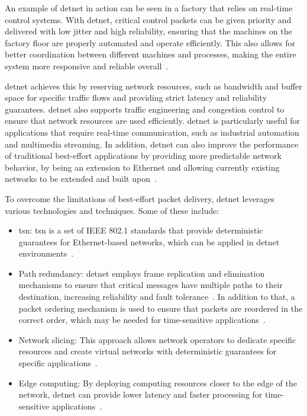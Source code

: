 \documentclass[runningheads]{llncs}
\begin{document}
An example of \gls{detnet} in action can be seen in a factory that relies on real-time control systems. With \gls{detnet}, critical control packets can be given priority and delivered with low jitter and high reliability, ensuring that the machines on the factory floor are properly automated and operate efficiently. This also allows for better coordination between different machines and processes, making the entire system more responsive and reliable overall~\cite{rfc8578}.

\gls{detnet} achieves this by reserving network resources, such as bandwidth and buffer space for specific traffic flows and providing strict latency and reliability guarantees. \gls{detnet} also supports traffic engineering and congestion control to ensure that network resources are used efficiently. \gls{detnet} is particularly useful for applications that require real-time communication, such as industrial automation and multimedia streaming. In addition, \gls{detnet} can also improve the performance of traditional best-effort applications by providing more predictable network behavior, by being an extension to Ethernet and allowing currently existing networks to be extended and built upon~\cite{rfc8578}.

To overcome the limitations of best-effort packet delivery, \gls{detnet} leverages various technologies and techniques. Some of these include:

\begin{itemize}
  \item \gls{tsn}: \gls{tsn} is a set of IEEE 802.1 standards that provide deterministic guarantees for Ethernet-based networks, which can be applied in \gls{detnet} environments~\cite{rfc9023}.
  \item Path redundancy: \gls{detnet} employs frame replication and elimination mechanisms to ensure that critical messages have multiple paths to their destination, increasing reliability and fault tolerance~\cite{rfc8655}. In addition to that, a packet ordering mechanism is used to ensure that packets are reordered in the correct order, which may be needed for time-sensitive applications~\cite{ietf-detnet-pof-02}.
  \item Network slicing: This approach allows network operators to dedicate specific resources and create virtual networks with deterministic guarantees for specific applications~\cite{rfc8655}.
  \item Edge computing: By deploying computing resources closer to the edge of the network, \gls{detnet} can provide lower latency and faster processing for time-sensitive applications~\cite{rfc8655}.
\end{itemize}
\end{document}
